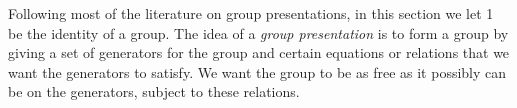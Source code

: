 \documentclass[11pt,oneside]{article}
\begin{document}
\fi
\renewcommand{\BookFooter}{Section 21 Group Presentations}
\ifdefined\BookMaster\else\setcounter{page}{177}\fi
\BookNarrativetrue

\begin{BookBody}



\noindent Following most of the literature on group presentations, in this section we let 1 be the identity of a group. The idea of a\textit{ group presentation} is to form a group by giving a set of generators for the group and certain equations or relations that we want the generators to satisfy. We want the group to be as free as it possibly can be on the generators, subject to these relations.

\end{BookBody}

\BookNarrativetrue
\end{document}
